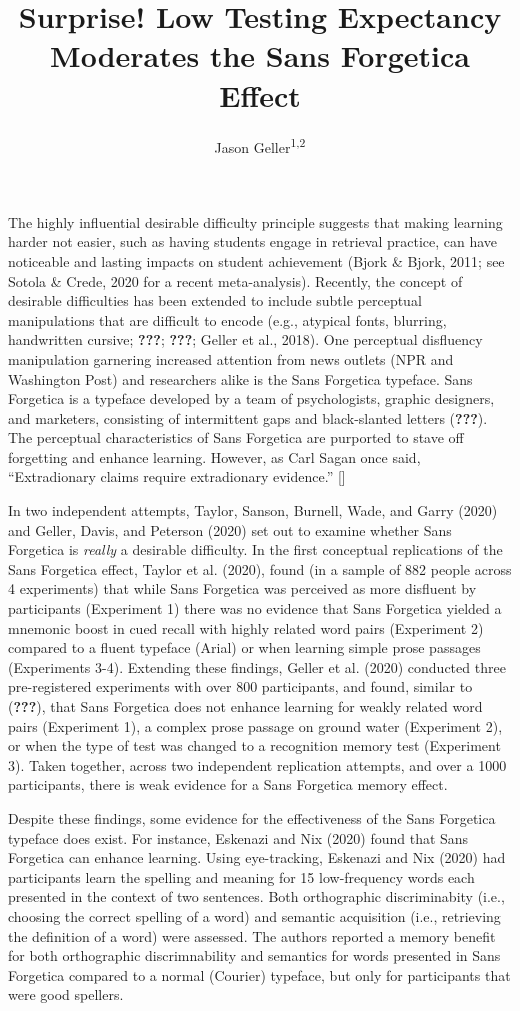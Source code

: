 \documentclass[
  english,
  man]{apa6}
\title{Surprise! Low Testing Expectancy Moderates the Sans Forgetica Effect}
\author{Jason Geller\textsuperscript{1,2}}
\date{}
\affiliation{\vspace{0.5cm}\textsuperscript{1} University of Iowa\\\textsuperscript{2} Rutgers Center for Cognitive Science}
\begin{document}
\maketitle

The highly influential desirable difficulty principle suggests that making learning harder not easier, such as having students engage in retrieval practice, can have noticeable and lasting impacts on student achievement (Bjork \& Bjork, 2011; see Sotola \& Crede, 2020 for a recent meta-analysis). Recently, the concept of desirable difficulties has been extended to include subtle perceptual manipulations that are difficult to encode (e.g., atypical fonts, blurring, handwritten cursive; {\textbf{???}}; {\textbf{???}}; Geller et al., 2018). One perceptual disfluency manipulation garnering increased attention from news outlets (NPR and Washington Post) and researchers alike is the Sans Forgetica typeface. Sans Forgetica is a typeface developed by a team of psychologists, graphic designers, and marketers, consisting of intermittent gaps and black-slanted letters ({\textbf{???}}). The perceptual characteristics of Sans Forgetica are purported to stave off forgetting and enhance learning. However, as Carl Sagan once said, \enquote{Extradionary claims require extradionary evidence.} {[}{]}

In two independent attempts, Taylor, Sanson, Burnell, Wade, and Garry (2020) and Geller, Davis, and Peterson (2020) set out to examine whether Sans Forgetica is \emph{really} a desirable difficulty. In the first conceptual replications of the Sans Forgetica effect, Taylor et al. (2020), found (in a sample of 882 people across 4 experiments) that while Sans Forgetica was perceived as more disfluent by participants (Experiment 1) there was no evidence that Sans Forgetica yielded a mnemonic boost in cued recall with highly related word pairs (Experiment 2) compared to a fluent typeface (Arial) or when learning simple prose passages (Experiments 3-4). Extending these findings, Geller et al. (2020) conducted three pre-registered experiments with over 800 participants, and found, similar to ({\textbf{???}}), that Sans Forgetica does not enhance learning for weakly related word pairs (Experiment 1), a complex prose passage on ground water (Experiment 2), or when the type of test was changed to a recognition memory test (Experiment 3). Taken together, across two independent replication attempts, and over a 1000 participants, there is weak evidence for a Sans Forgetica memory effect.

Despite these findings, some evidence for the effectiveness of the Sans Forgetica typeface does exist. For instance, Eskenazi and Nix (2020) found that Sans Forgetica can enhance learning. Using eye-tracking, Eskenazi and Nix (2020) had participants learn the spelling and meaning for 15 low-frequency words each presented in the context of two sentences. Both orthographic discriminabity (i.e., choosing the correct spelling of a word) and semantic acquisition (i.e., retrieving the definition of a word) were assessed. The authors reported a memory benefit for both orthographic discrimnability and semantics for words presented in Sans Forgetica compared to a normal (Courier) typeface, but only for participants that were good spellers.
\end{document}
